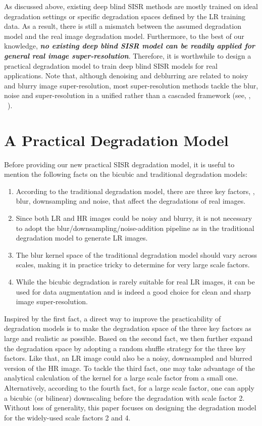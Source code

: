 \documentclass[10pt,twocolumn,letterpaper]{article}
\begin{document}
As discussed above, existing deep blind SISR methods are mostly trained on ideal degradation settings or specific degradation spaces defined by the LR training data.
As a result, there is still a mismatch between the assumed degradation model and the real image degradation model.
Furthermore, to the best of our knowledge, \textbf{\emph{no existing deep blind SISR model can be readily applied for general real image super-resolution}}.
Therefore, it is worthwhile to design a practical degradation model to train deep blind SISR models for real applications.
Note that, although denoising and deblurring are related to noisy and blurry image super-resolution, most super-resolution methods tackle the blur, noise and super-resolution in a unified rather than a cascaded framework (see, \eg, ~\cite{liu2013bayesian,efrat2013accurate,dong2013nonlocally,zhang2017learning,riegler2015conditioned,shocher2018zero,zhang2018learning,zhang2020deep,ji2020real,yuan2018unsupervised,lugmayr2019unsupervised,lugmayr2020ntire}).


\section{A Practical Degradation Model}
\label{sec:method}
Before providing our new practical SISR degradation model, it is useful to mention the following facts on the bicubic and traditional degradation models:
\begin{enumerate}
\item According to the traditional degradation model, there are three key factors, \ie, blur, downsampling and noise, that affect the degradations of real images.
\item Since both LR and HR images could be noisy and blurry, it is not necessary to adopt the blur/downsampling/noise-addition pipeline as in the traditional degradation model to generate LR images.
\item The blur kernel space of the traditional degradation model should vary across scales, making it in practice tricky to determine for very large scale factors.
\item While the bicubic degradation is rarely suitable for real LR images, it can be used for data augmentation and is indeed a good choice for clean and sharp image super-resolution.
\end{enumerate}


Inspired by the first fact, a direct way to improve the practicability of degradation models is to make  the degradation space of the three key factors as large and realistic as possible.
Based on the second fact, we then further expand the degradation space by adopting a random shuffle strategy for the three key factors. Like that, an LR image could also be a noisy, downsampled and blurred version of the HR image.
To tackle the third fact,
one may take advantage of the analytical calculation of the kernel for a large scale factor from a small one.
Alternatively, according to the fourth fact, for a large scale factor, one can apply a bicubic (or bilinear) downscaling before the degradation with scale factor 2.
Without loss of generality, this paper focuses on designing the degradation model for the widely-used scale factors 2 and 4.
\end{document}
